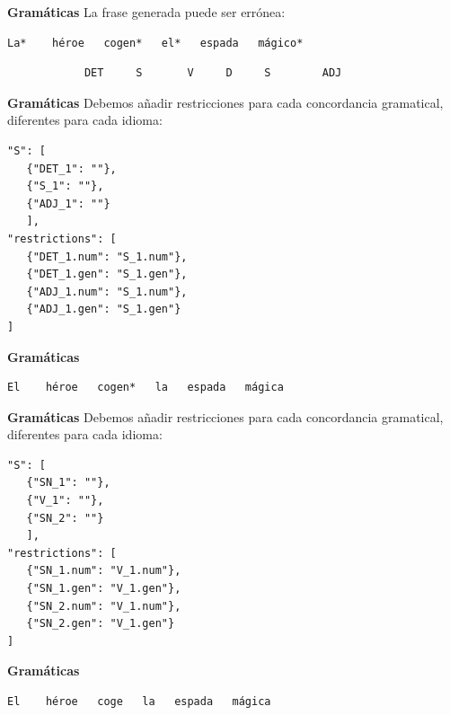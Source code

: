 \begin{frame}[t, fragile]{\textbf{Gramáticas}}
La frase generada puede ser errónea:
	\vspace*{\fill}
		\begin{Verbatim}[commandchars=+\[\]]
La*    héroe   cogen*   el*   espada   mágico*
		\end{Verbatim}
		\begin{verbatim}
			DET     S       V     D     S        ADJ
		\end{verbatim}
	\vspace*{\fill}
\end{frame}

\begin{frame}[t, fragile]{\textbf{Gramáticas}}
	Debemos añadir restricciones para cada concordancia gramatical, diferentes para cada idioma:
	\begin{Verbatim}[fontsize=\tiny]
"S": [
   {"DET_1": ""},
   {"S_1": ""},
   {"ADJ_1": ""}
   ],
"restrictions": [
   {"DET_1.num": "S_1.num"},
   {"DET_1.gen": "S_1.gen"},
   {"ADJ_1.num": "S_1.num"},
   {"ADJ_1.gen": "S_1.gen"}
]
	\end{Verbatim}
\end{frame}

\begin{frame}[t, fragile]{\textbf{Gramáticas}}
	\vspace*{\fill}
	\begin{Verbatim}
El    héroe   cogen*   la   espada   mágica
	\end{Verbatim}
	\vspace*{\fill}
\end{frame}

\begin{frame}[t, fragile]{\textbf{Gramáticas}}
	Debemos añadir restricciones para cada concordancia gramatical, diferentes para cada idioma:
	\begin{Verbatim}[fontsize=\tiny]
"S": [
   {"SN_1": ""},
   {"V_1": ""},
   {"SN_2": ""}
   ],
"restrictions": [
   {"SN_1.num": "V_1.num"},
   {"SN_1.gen": "V_1.gen"},
   {"SN_2.num": "V_1.num"},
   {"SN_2.gen": "V_1.gen"}
]
	\end{Verbatim}
\end{frame}

\begin{frame}[t, fragile]{\textbf{Gramáticas}}
	\vspace*{\fill}
	\begin{Verbatim}
El    héroe   coge   la   espada   mágica
	\end{Verbatim}
	\vspace*{\fill}
\end{frame}

